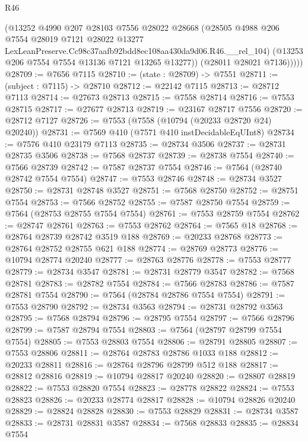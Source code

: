 \begin{lexlean}{R46}
\begin{coremodule}
            (@13252
              @4990
              @207
              @28103
              @7556
              @28022
              @28668
              (@28505
                @4988
                @206
                @7554
                @28019
                @7121
                @28022
                @13277
                LexLeanPreserve.Cc98c37aafb92bdd8ec108aa430da9d06.R46.__rel_104)
              (@13253 @206 @7554 @7554 @13136 @7121 @13265 @13277))
            (@28011 @28021 @7136)))))
@28709 := @7656 @7115
@28710 := (state : @28709) -> @7551
@28711 := (subject : @7115) -> @28710
@28712 := @22142 @7115
@28713 := @28712 @7113
@28714 := @27673 @28713
@28715 := @7558 @28714
@28716 := @7553 @28715
@28717 := @27677 @28713
@28719 := @23167 @28717 @7556
@28720 := @28712 @7127
@28726 := @7553 (@7558 (@10794 (@20233 @28720 @24) @20240))
@28731 := @7569 @410 (@7571 @410 instDecidableEqUInt8)
@28734 := @7576 @410 @23179 @7113
@28735 := @28734 @3506
@28737 := @28731 @28735 @3506
@28738 := @7568 @28737
@28739 := @28738 @7554
@28740 := @7566 @28739
@28742 := @7587 @28737 @7554
@28746 := @7564 (@28740 @28742 @7554 @7554)
@28747 := @7553 @28746
@28748 := @28734 @3527
@28750 := @28731 @28748 @3527
@28751 := @7568 @28750
@28752 := @28751 @7554
@28753 := @7566 @28752
@28755 := @7587 @28750 @7554
@28759 := @7564 (@28753 @28755 @7554 @7554)
@28761 := @7553 @28759 @7554
@28762 := @28747 @28761
@28763 := @7553 @28762
@28764 := @7565 @18
@28768 := @28764 @28739 @28742 @3519 @188
@28769 := @20233 @28768
@28773 := @28764 @28752 @28755 @621 @188
@28774 := @28769 @28773
@28776 := @10794 @28774 @20240
@28777 := @28763 @28776
@28778 := @7553 @28777
@28779 := @28734 @3547
@28781 := @28731 @28779 @3547
@28782 := @7568 @28781
@28783 := @28782 @7554
@28784 := @7566 @28783
@28786 := @7587 @28781 @7554
@28790 := @7564 (@28784 @28786 @7554 @7554)
@28791 := @7553 @28790
@28792 := @28734 @3563
@28794 := @28731 @28792 @3563
@28795 := @7568 @28794
@28796 := @28795 @7554
@28797 := @7566 @28796
@28799 := @7587 @28794 @7554
@28803 := @7564 (@28797 @28799 @7554 @7554)
@28805 := @7553 @28803 @7554
@28806 := @28791 @28805
@28807 := @7553 @28806
@28811 := @28764 @28783 @28786 @1033 @188
@28812 := @20233 @28811
@28816 := @28764 @28796 @28799 @512 @188
@28817 := @28812 @28816
@28819 := @10794 @28817 @20240
@28820 := @28807 @28819
@28822 := @7553 @28820 @7554
@28823 := @28778 @28822
@28824 := @7553 @28823
@28826 := @20233 @28774 @28817
@28828 := @10794 @28826 @20240
@28829 := @28824 @28828
@28830 := @7553 @28829
@28831 := @28734 @3587
@28833 := @28731 @28831 @3587
@28834 := @7568 @28833
@28835 := @28834 @7554

\end{coremodule}
\end{lexlean}
